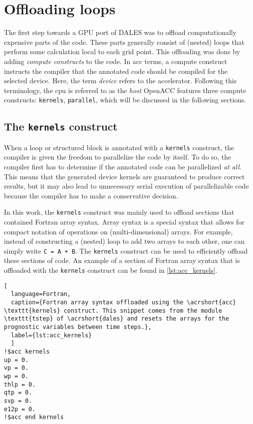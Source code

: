 \section{Offloading loops}
The first step towards a GPU port of DALES was to offload computationally expensive parts of the code. These parts generally consist of (nested) loops that perform some calculation local to each grid point. This offloading was done by adding \emph{compute constructs} to the code. In \acrshort{acc} terms, a compute construct instructs the compiler that the annotated code should be compiled for the selected device. Here, the term \emph{device} refers to the accelerator. Following this terminology, the \acrshort{cpu} is referred to as the \emph{host} OpenACC features three compute constructs: \texttt{kernels}, \texttt{parallel}, which will be discussed in the following sections. 

\subsection{The \texttt{kernels} construct}
When a loop or structured block is annotated with a \texttt{kernels} construct, the compiler is given the freedom to parallelize the code by itself. To do so, the compiler first has to determine if the annotated code can be parallelized \emph{at all}. This means that the generated device kernels are guaranteed to produce correct results, but it may also lead to unnecessary serial execution of parallelizable code because the compiler has to make a conservative decision.

In this work, the \texttt{kernels} construct was mainly used to offload sections that contained Fortran array syntax. Array syntax is a special syntax that allows for compact notation of operations on (multi-dimensional) arrays. For example, instead of constructing a (nested) loop to add two arrays to each other, one can simply write \texttt{C = A + B}. The \texttt{kernels} construct can be used to efficiently offload these sections of code. An example of a section of Fortran array syntax that is offloaded with the \texttt{kernels} construct can be found in \autoref{lst:acc_kernels}.

\begin{lstlisting}[
  language=Fortran,
  caption={Fortran array syntax offloaded using the \acrshort{acc} \texttt{kernels} construct. This snippet comes from the module \texttt{tstep} of \acrshort{dales} and resets the arrays for the prognostic variables between time steps.},
  label={lst:acc_kernels}
  ]
!$acc kernels
up = 0.
vp = 0.
wp = 0.
thlp = 0.
qtp = 0.
svp = 0.
e12p = 0.
!$acc end kernels
\end{lstlisting}

